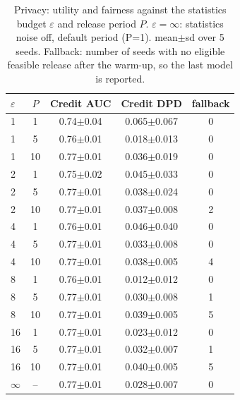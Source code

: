 \begin{table}[t]
\centering
\footnotesize
\caption{Privacy: utility and fairness against the statistics budget $\varepsilon$ and release period $P$. $\varepsilon=\infty$: statistics noise off, default period (P=1). mean$\pm$sd over 5 seeds. Fallback: number of seeds with no eligible feasible release after the warm-up, so the last model is reported.}
\label{tab:e5_credit}
\setlength{\tabcolsep}{3pt}
\begin{tabular}{lcccc}
\toprule
$\varepsilon$ & $P$ & Credit AUC & Credit DPD & fallback \\
\midrule
1 & 1 & 0.74$\pm$0.04 & 0.065$\pm$0.067 & 0 \\
1 & 5 & 0.76$\pm$0.01 & 0.018$\pm$0.013 & 0 \\
1 & 10 & 0.77$\pm$0.01 & 0.036$\pm$0.019 & 0 \\
2 & 1 & 0.75$\pm$0.02 & 0.045$\pm$0.033 & 0 \\
2 & 5 & 0.77$\pm$0.01 & 0.038$\pm$0.024 & 0 \\
2 & 10 & 0.77$\pm$0.01 & 0.037$\pm$0.008 & 2 \\
4 & 1 & 0.76$\pm$0.01 & 0.046$\pm$0.040 & 0 \\
4 & 5 & 0.77$\pm$0.01 & 0.033$\pm$0.008 & 0 \\
4 & 10 & 0.77$\pm$0.01 & 0.038$\pm$0.005 & 4 \\
8 & 1 & 0.76$\pm$0.01 & 0.012$\pm$0.012 & 0 \\
8 & 5 & 0.77$\pm$0.01 & 0.030$\pm$0.008 & 1 \\
8 & 10 & 0.77$\pm$0.01 & 0.039$\pm$0.005 & 5 \\
16 & 1 & 0.77$\pm$0.01 & 0.023$\pm$0.012 & 0 \\
16 & 5 & 0.77$\pm$0.01 & 0.032$\pm$0.007 & 1 \\
16 & 10 & 0.77$\pm$0.01 & 0.040$\pm$0.005 & 5 \\
$\infty$ & -- & 0.77$\pm$0.01 & 0.028$\pm$0.007 & 0 \\
\bottomrule
\end{tabular}
\end{table}
